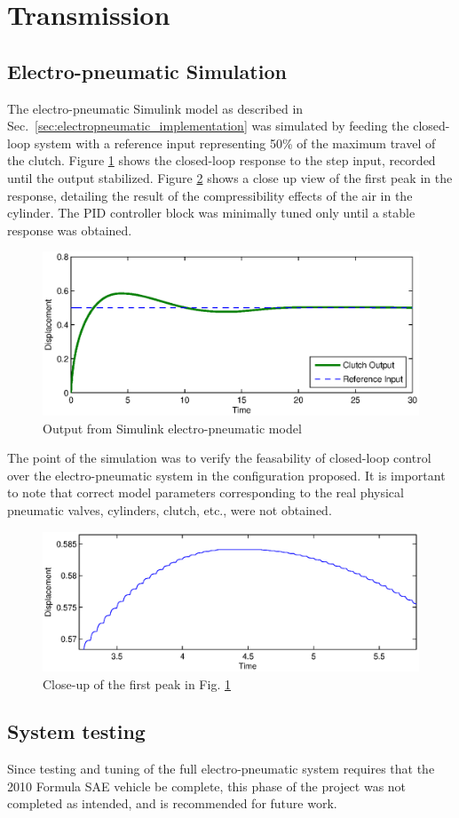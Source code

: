 \section{Transmission}

\subsection{Electro-pneumatic Simulation}

The electro-pneumatic Simulink model as described in Sec.\ \ref{sec:electropneumatic_implementation} was simulated by feeding the closed-loop system with a reference input representing 50\% of the maximum travel of the clutch. Figure \ref{fig:pneumatic_sim} shows the closed-loop response to the step input, recorded until the output stabilized. Figure \ref{fig:pneumatic_sim_zoom} shows a close up view of the first peak in the response, detailing the result of the compressibility effects of the air in the cylinder. The PID controller block was minimally tuned only until a stable response was obtained.

\begin{figure}[htp]
 \centering
 \includegraphics[width=6in,keepaspectratio]{results/figures/electro-pneumatic_simulation_plot.eps}
 \caption{Output from Simulink electro-pneumatic model}
 \label{fig:pneumatic_sim}
\end{figure}

The point of the simulation was to verify the feasability of closed-loop control over the electro-pneumatic system in the configuration proposed. It is important to note that correct model parameters corresponding to the real physical pneumatic valves, cylinders, clutch, etc., were not obtained.

\begin{figure}[htp]
 \centering
 \includegraphics[width=6in,keepaspectratio]{results/figures/electro-pneumatic_simulation_plot2.eps}
 \caption{Close-up of the first peak in Fig. \ref{fig:pneumatic_sim}}
 \label{fig:pneumatic_sim_zoom}
\end{figure}


\subsection{System testing}

Since testing and tuning of the full electro-pneumatic system requires that the 2010 Formula SAE vehicle be complete, this phase of the project was not completed as intended, and is recommended for future work.